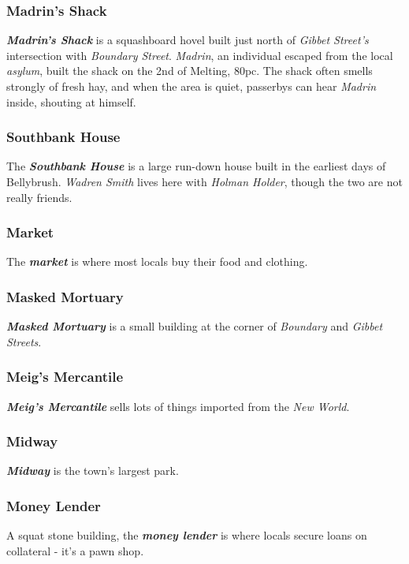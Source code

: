 \documentclass[11pt]{teraum_adventure}
\begin{document}
\subsubsection*{Madrin's Shack}
\label{sec:org401ba6e}
\textbf{\emph{Madrin's Shack}} is a squashboard hovel built just north of \emph{Gibbet
Street's} intersection with \emph{Boundary Street}. \emph{Madrin}, an
individual escaped from the local \emph{asylum}, built the shack on the 2nd
of Melting, 80pc. The shack often smells strongly of fresh hay, and
when the area is quiet, passerbys can hear \emph{Madrin} inside, shouting
at himself.
\subsubsection*{Southbank House}
\label{sec:orgcc83458}
The \textbf{\emph{Southbank House}} is a large run-down house built in the
earliest days of Bellybrush. \emph{Wadren Smith} lives here with \emph{Holman
Holder}, though the two are not really friends.
\subsubsection*{Market}
\label{sec:orgc24b666}
The \textbf{\emph{market}} is where most locals buy their food and clothing.
\subsubsection*{Masked Mortuary}
\label{sec:org86e6a84}
\textbf{\emph{Masked Mortuary}} is a small building at the corner of \emph{Boundary}
 and \emph{Gibbet Streets}.
\subsubsection*{Meig's Mercantile}
\label{sec:org7935384}
\textbf{\emph{Meig's Mercantile}} sells lots of things imported from the \emph{New World}.
\subsubsection*{Midway}
\label{sec:orgec0f10e}
\textbf{\emph{Midway}} is the town's largest park.
\subsubsection*{Money Lender}
\label{sec:orga44bf76}
A squat stone building, the \textbf{\emph{money lender}} is where locals secure
loans on collateral - it's a pawn shop.
\end{document}
